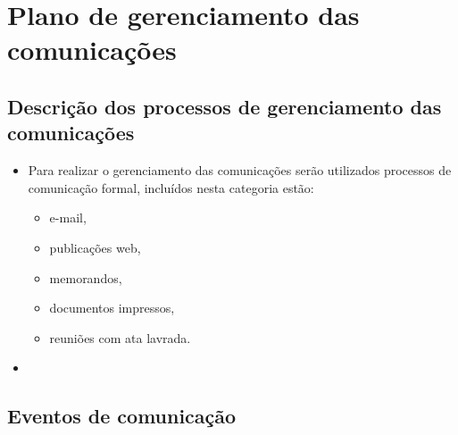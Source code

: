 
\chapter{Plano de gerenciamento das comunicações}
\label{ch:communication-management-plan}


\section{Descrição dos processos de gerenciamento das comunicações}


\begin{itemize}
\item Para realizar o gerenciamento das comunicações serão utilizados processos de comunicação formal, incluídos nesta categoria estão:
\begin{itemize}
\item e-mail,
\item publicações web,
\item memorandos,
\item documentos impressos,
\item reuniões com ata lavrada.
\end{itemize}
\item 
\end{itemize}

\section{Eventos de comunicação}


